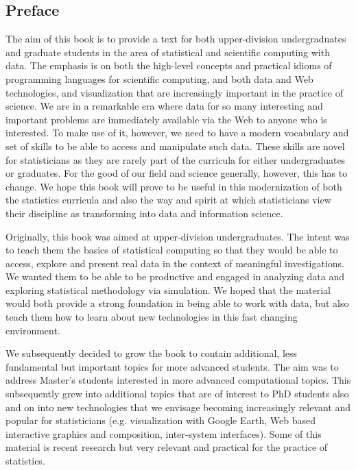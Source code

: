 \subsection*{Preface} 

The aim of this book is to provide a text for both upper-division
undergraduates and graduate students in the area of statistical and
scientific computing with data.  The emphasis is on both the
high-level concepts and practical idioms of programming languages for
scientific computing, and both data and Web technologies, and
visualization that are increasingly important in the practice of
science.  We are in a remarkable era where data for so many
interesting and important problems are immediately available via the
Web to anyone who is interested.  To make use of it, however, we need
to have a modern vocabulary and set of skills to be able to access and
manipulate such data.  These skills are novel for statisticians as
they are rarely part of the curricula for either undergraduates or
graduates.  For the good of our field and science generally, however,
this has to change. We hope this book will prove to be useful in this
modernization of both the statistics curricula and also the way and
spirit at which statisticians view their discipline as transforming
into data and information science.


Originally, this book was aimed at upper-division undergraduates.  The
intent was to teach them the basics of statistical computing so that
they would be able to access, explore and present real data in the
context of meaningful investigations.  We wanted them to be able to be
productive and engaged in analyzing data and exploring statistical
methodology via simulation.  We hoped that the material would both
provide a strong foundation in being able to work with data, but also
teach them how to learn about new technologies in this fast changing
environment.

We subsequently decided to grow the book to contain additional, less
fundamental but important topics for more advanced students. The aim
was to address Master's students interested in more advanced
computational topics. This subsequently grew into additional topics
that are of interest to PhD students also and on into new technologies that
we envisage becoming increasingly relevant and popular for
statisticians (e.g. visualization with Google Earth, Web based
interactive graphics and composition, inter-system interfaces).  Some
of this material is recent research but very relevant and practical
for the practice of statistics.

